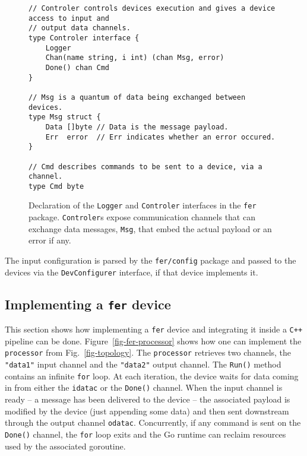 \documentclass{webofc}
\begin{document}
\begin{figure}[h]
	\centering
	\begin{verbatim}
// Controler controls devices execution and gives a device access to input and
// output data channels.
type Controler interface {
	Logger
	Chan(name string, i int) (chan Msg, error)
	Done() chan Cmd
}

// Msg is a quantum of data being exchanged between devices.
type Msg struct {
	Data []byte // Data is the message payload.
	Err  error  // Err indicates whether an error occured.
}

// Cmd describes commands to be sent to a device, via a channel.
type Cmd byte
	\end{verbatim}
	\caption{Declaration of the \texttt{Logger} and \texttt{Controler} interfaces in the \texttt{fer} package.
	\texttt{Controler}s expose communication channels that can exchange data messages, \texttt{Msg}, that embed the actual payload or an error if any.
}
	\label{fig-fer-controler}
\end{figure}

The input configuration is parsed by the \texttt{fer/config} package and passed to the devices via the \texttt{DevConfigurer} interface, if that device implements it.

\subsection{Implementing a \texttt{fer} device}
This section shows how implementing a \texttt{fer} device and integrating it inside a \texttt{C++} pipeline can be done.
Figure~\ref{fig-fer-processor} shows how one can implement the \texttt{processor} from Fig.~\ref{fig-topology}.
The \texttt{processor} retrieves two channels, the \texttt{"data1"} input channel and the \texttt{"data2"} output channel.
The \texttt{Run()} method contains an infinite \texttt{for} loop.
At each iteration, the device waits for data coming in from either the \texttt{idatac} or the \texttt{Done()} channel.
When the input channel is ready -- a message has been delivered to the device -- the associated payload is modified by the device (just appending some data) and then sent downstream through the output channel \texttt{odatac}.
Concurrently, if any command is sent on the \texttt{Done()} channel, the \texttt{for} loop exits and the Go runtime can reclaim resources used by the associated goroutine.
\end{document}

